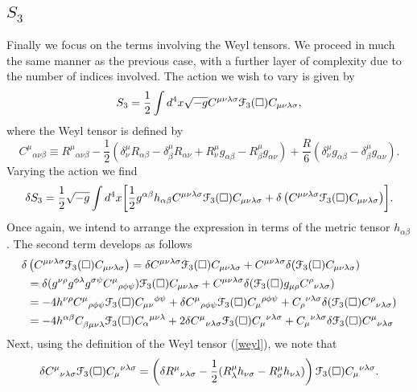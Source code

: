 \subsection{$S_3$}
Finally we focus on the terms involving the Weyl tensors. We proceed in much the same manner as the previous case, with a further layer of complexity due to the number of indices involved. The action we wish to vary is given by
\[
S_{3}=\frac{1}{2}\int d^{4}x\sqrt{-g}C^{\mu\nu\lambda\sigma}{\cal
F}_{3}(\Box)C_{\mu\nu\lambda\sigma},
\]
where the Weyl tensor is defined by
\[
\label{weyl}
C^{\mu}{ }_{\alpha\nu\beta}\equiv R^{\mu}{ }_{\alpha\nu\beta}-\frac{1}{2}(\delta_{\nu}^{
\mu}R_{\alpha\beta}-\delta_{\beta}^{\mu}R_{\alpha\nu}+R_{\nu}^{\mu}g_{
\alpha\beta}-R_{\beta}^{\mu}g_{\alpha\nu})+\frac{R}{6}(\delta_{\nu}^{\mu}g_{
\alpha\beta}-\delta_{\beta}^{\mu}g_{\alpha\nu})
.\]
Varying the action we find
\[\delta S_{3}=\frac{1}{2}\sqrt{-g}\int d^{4}x\biggl[\frac{1}{2}g^{\alpha\beta}h_{\alpha\beta}C^{\mu\nu\lambda\sigma}{\cal F}_{3}(\Box)C_{\mu\nu\lambda\sigma}+\delta\left(C^{\mu\nu\lambda\sigma}{\cal F}_{3}(\Box)C_{\mu\nu\lambda\sigma}\right)\biggr].
 \]
Once again, we intend to arrange the expression in terms of the metric tensor $h_{\alpha\beta}$. The second term develops as follows
\begin{align}
\delta&\left(C^{\mu\nu\lambda\sigma}{\cal F}_{3}(\Box)C_{\mu\nu\lambda\sigma}\right)	=	\delta C^{\mu\nu\lambda\sigma}{\cal F}_{3}(\Box)C_{\mu\nu\lambda\sigma}+C^{\mu\nu\lambda\sigma}\delta({\cal F}_{3}(\Box)C_{\mu\nu\lambda\sigma})
	\nonumber\\&=	\delta(g^{\nu\rho}g^{\phi\lambda}g^{\sigma\psi}C^{\mu}{ }_{\rho\phi\psi}){\cal F}_{3}(\Box)C_{\mu\nu\lambda\sigma}+C^{\mu\nu\lambda\sigma}\delta({\cal F}_{3}(\Box)g_{\mu\rho}C^{\rho}{ }_{\nu\lambda\sigma})
	\nonumber\\&=	-4h^{\nu\rho}C^{\mu}{ }_{\rho\phi\psi}{\cal F}_{3}(\Box)C_{\mu\nu}{ }{ }^{\phi\psi}+\delta C^{\mu}{ }_{\rho\phi\psi}{\cal F}_{3}(\Box)C_{\mu}{ }^{\rho\phi\psi}+C_{\rho}{ }^{\nu\lambda\sigma}\delta({\cal F}_{3}(\Box)C^{\rho}{ }_{\nu\lambda\sigma})
	\nonumber\\&=	-4h^{\alpha\beta}C_{\beta\mu\nu\lambda}^{\;}{\cal F}_{3}(\Box)C_{\alpha}{ }^{\mu\nu\lambda}+2\delta C^{\mu}{ }_{\nu\lambda\sigma}{\cal F}_{3}(\Box)C_{\mu}{ }^{\nu\lambda\sigma}+C_{\mu}{ }^{\nu\lambda\sigma}\delta{\cal F}_{3}(\Box)C^{\mu}{ }_{\nu\lambda\sigma}
  \end{align}
Next, using the definition of the Weyl tensor (\eqref{weyl}), we note that
\[
\delta C^{\mu}{ }_{\nu\lambda\sigma}{\cal F}_{3}(\Box)C_{\mu}{ }^{\nu\lambda\sigma}=\left(\delta R^{\mu}{ }_{\nu\lambda\sigma}-\frac{1}{2}(R_{\lambda}^{\mu}h_{\nu\sigma}-R_{\sigma}^{\mu}h_{\nu\lambda})\right){\cal F}_{3}(\Box)C_{\mu}{ }^{\nu\lambda\sigma}.
\]
